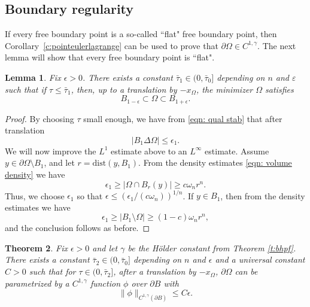 \documentclass[10pt, reqno]{amsart}
\numberwithin{equation}{section}
\newtheorem{theorem}{Theorem}[section]
\newtheorem{lemma}[theorem]{Lemma}
\def\e{\varepsilon}
\def\W{\Omega}
\begin{document}
\subsection{Boundary regularity} \label{s:boundaryregularity}


If every free boundary point is a so-called ``flat" free boundary point, then  Corollary~\ref{c:pointeulerlagrange} can be used to prove that $\partial \W \in C^{1,\gamma}$. The next lemma will show that every free boundary point is ``flat". 

\begin{lemma} \label{l:flat}
 Fix $\epsilon>0$. There exists a constant $\bar{\tau}_1\in (0, \bar{\tau}_0]$ depending on $n$ and $\e$ such that if $\tau \leq \bar{\tau}_1$, then, up to a translation by $-x_\W$, the minimizer $\W$ satisfies 
 \[
 B_{1-\epsilon} \subset \W \subset B_{1+\epsilon}. 
 \]
\end{lemma}

\begin{proof}
 By choosing $\tau$ small enough, we have from \eqref{eqn: qual stab} that after translation 
 \[
  |B_1 \Delta \W| \leq \epsilon_1. 
 \]
 We will now improve the $L^1$ estimate above to an $L^{\infty}$ estimate. Assume $y \in \partial \W \setminus B_1$, and let $r=\text{dist}(y,B_1)$. From the density estimates \eqref{eqn: volume density} we have
 \[
 \epsilon_1 \geq |\W \cap B_r(y)| \geq c \omega_n r^n.
 \]
 Thus, we choose $\epsilon_1$ so that $\epsilon \leq (\epsilon_1 /(c\omega_n))^{1/n}$. If $y \in B_1$, then from the density estimates we have 
 \[
 \epsilon_1 \geq |B_1 \setminus \W|\geq (1-c) \omega_n r^n, 
 \]
 and the conclusion follows as before. 
\end{proof}

\begin{theorem} \label{t:c1alpha}
 Fix $\epsilon>0$ and let $\gamma$ be the H\"older constant from Theorem \ref{t:bhpf}. There exists a constant $\bar{\tau}_2 \in (0, \bar{\tau}_0]$ depending on $n$ and $\epsilon$ and a universal constant $C>0$ such that for $\tau \in (0,\bar{\tau}_2]$, after a translation by $-x_\W$,   $\partial \W$ can be parametrized by a $C^{1,\gamma}$ function $\phi$ over $\partial B$ with 
 \[
 \|\phi \|_{C^{1,\gamma}(\partial B)} \leq C \epsilon. 
 \]
\end{theorem}
\end{document}
